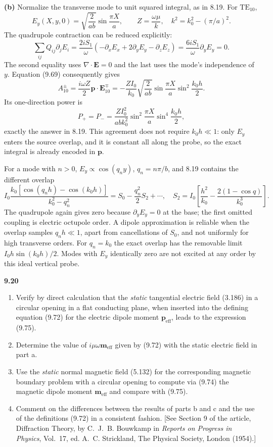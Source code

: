 \textbf{(b)} Normalize the transverse mode to unit squared integral,
as in 8.19. For $\mathrm{TE}_{10}$,
\[
E_y(X,y,0)=\sqrt{\frac2{ab}}\sin\frac{\pi X}a,\qquad
Z=\frac{\omega\mu}{k},\quad k^2=k_0^2-(\pi/a)^2.
\]
The quadrupole contraction can be reduced explicitly:
\[
\sum_{ij}Q_{ij}\partial_jE_i
=\frac{2iS_1}{\omega}
(-\partial_xE_x+2\partial_yE_y-\partial_zE_z)
=\frac{6iS_1}{\omega}\partial_yE_y=0.
\]
The second equality uses $\nabla\cdot\mathbf E=0$ and the last uses the
mode's independence of $y$. Equation (9.69) consequently gives
\[
A_{10}^{\pm}=\frac{i\omega Z}{2}\mathbf p\cdot\mathbf E_{10}^{\mp}
=-\frac{ZI_0}{k_0}\sqrt{\frac2{ab}}\sin\frac{\pi X}a
\sin^2\frac{k_0h}{2}.
\]
Its one-direction power is
\[
\boxed{P_+=P_-=
\frac{ZI_0^2}{abk_0^2}\sin^2\frac{\pi X}a\sin^4\frac{k_0h}{2},}
\]
exactly the answer in 8.19. This agreement does not require $k_0h\ll1$:
only $E_y$ enters the source overlap, and it is constant all along the
probe, so the exact integral is already encoded in $\mathbf p$.

For a mode with $n>0$, $E_y\propto\cos(q_ny)$, $q_n=n\pi/b$, and
8.19 contains the different overlap
\[
I_0\frac{k_0[\cos(q_nh)-\cos(k_0h)]}{k_0^2-q_n^2}
=S_0-\frac{q_n^2}{2}S_2+\cdots,
\quad
S_2=I_0\left[\frac{h^2}{k_0}
-\frac{2(1-\cos q)}{k_0^3}\right].
\]
The quadrupole again gives zero because $\partial_yE_y=0$ at the base;
the first omitted coupling is electric octupole order. A dipole
approximation is reliable when the overlap samples $q_nh\ll1$, apart
from cancellations of $S_0$, and not uniformly for high transverse
orders. For $q_n=k_0$ the exact overlap has the removable limit
$I_0h\sin(k_0h)/2$. Modes with $E_y$ identically zero are not excited
at any order by this ideal vertical probe.

\par\bigskip
\noindent\textbf{9.20}\quad\begin{enumerate}
\item[(a)] Verify by direct calculation that the \emph{static} tangential electric field (3.186) in a circular opening in a flat conducting plane, when inserted into the defining equation (9.72) for the electric dipole moment $\mathbf{p}_{\mathrm{eff}}$, leads to the expression (9.75).
\item[(b)] Determine the value of $i\mu\omega\mathbf{m}_{\mathrm{eff}}$ given by (9.72) with the static electric field in part a.
\item[(c)] Use the \emph{static} normal magnetic field (5.132) for the corresponding magnetic boundary problem with a circular opening to compute via (9.74) the magnetic dipole moment $\mathbf{m}_{\mathrm{eff}}$ and compare with (9.75).
\item[(d)] Comment on the differences between the results of parts b and c and the use of the definitions (9.72) in a consistent fashion. [See Section 9 of the article, Diffraction Theory, by C.~J.~B. Bouwkamp in \emph{Reports on Progress in Physics}, Vol.~17, ed. A.~C. Strickland, The Physical Society, London (1954).]
\end{enumerate}
\solution

